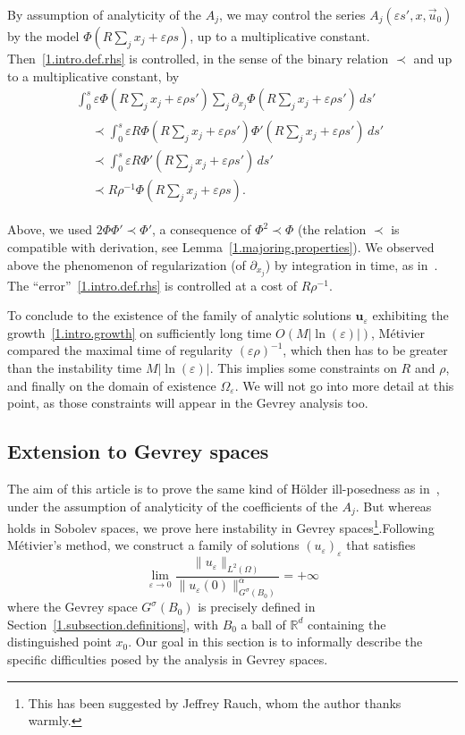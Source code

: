 \documentclass[AHL,Unicode,longabstracts,published]{cedram}
\theoremstyle{plain}
\newcommand*\e{\varepsilon}
\newcommand*\R{{\mathbb R}}
\newcommand{\dptl}{\partial}%
\newcommand{\alf}{\alpha}%
\newcommand{\ubf}{{\mathbf u}}
\begin{document}
By assumption of analyticity of the $A_j$, we may control the series $A_j(\e s',x, \vec{u}_0)$ by the model $\Phi(R \sum_j x_j + \e\rho s)$, up to a multiplicative constant. Then~\eqref{1.intro.def.rhs} is controlled, in the sense of the binary relation $\prec$ and up to a multiplicative constant, by
\begin{multline*}
\int_{0}^{s} \e \Phi(R \sum_j x_j + \e\rho s') \sum_j \dptl_{x_j} \Phi\left(R \sum_j x_j + \e\rho s'\right) \, ds' \\
\begin{aligned}
& \prec \int_{0}^{s} \e R \Phi(R \sum_j x_j + \e\rho s') \Phi'\left(R \sum_j x_j + \e\rho s'\right) \, ds' \\
& \prec \int_{0}^{s} \e R \Phi'\left(R \sum_j x_j + \e\rho s'\right) \, ds' \\
& \prec R\rho^{-1} \Phi\left(R \sum_j x_j + \e\rho s\right).
\end{aligned}
\end{multline*}


Above, we used $2\Phi \Phi' \prec \Phi'$, a consequence of $\Phi^2 \prec \Phi$ (the relation $\prec$ is compatible with derivation, see Lemma~\ref{1.majoring.properties}). We observed above the phenomenon of regularization (of $\dptl_{x_j}$) by integration in time, as in~\cite{ukai2001boltzmann}. The ``error''~\eqref{1.intro.def.rhs} is controlled at a cost of $R\rho^{-1}$.

To conclude to the existence of the family of analytic solutions $\ubf_{\e}$ exhibiting the growth~\eqref{1.intro.growth} on sufficiently long time $O(M|\ln(\e)|)$, Métivier compared the maximal time of regularity $(\e\rho)^{-1}$, which then has to be greater than the instability time $M|\ln(\e)|$. This implies some constraints on $R$ and $\rho$, and finally on the domain of existence $\Omega_{\e}$. We will not go into more detail at this point, as those constraints will appear in the Gevrey analysis too.


\subsection{Extension to Gevrey spaces}\label{1.intro.extension}


The aim of this article is to prove the same kind of H\"older ill-posedness as in~\cite{metivier2005remarks}, under the assumption of analyticity of the coefficients of the $A_j$. But whereas~\cite{metivier2005remarks} holds in Sobolev spaces, we prove here instability in Gevrey spaces\footnote{This has been suggested by Jeffrey Rauch, whom the author thanks warmly.}.\linebreak Following Métivier's method, we construct a family of solutions $(u_{\e})_{\e}$ that satisfies
\begin{equation}\label{1.intro.holder.gevrey}
\lim_{\e\to0} \frac{\|u_{\e}\|_{L^2(\Omega)}}{\|u_{\e}(0)\|^{\alf}_{G^{\sigma}(B_0)}} = +\infty
\end{equation}
where the Gevrey space $G^{\sigma}(B_0)$ is precisely defined in Section~\ref{1.subsection.definitions}, with $B_0$ a ball of $\R^{d}$ containing the distinguished point $x_0$. Our goal in this section is to informally describe the specific difficulties posed by the analysis in Gevrey spaces.
\end{document}
